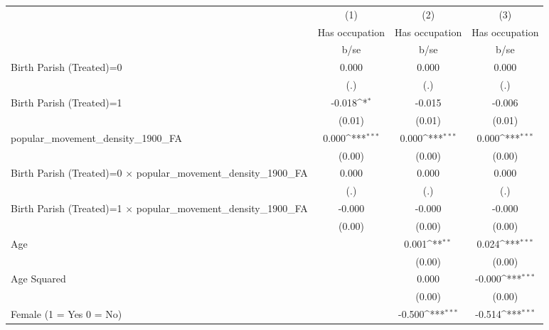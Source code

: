 {
\def\sym#1{\ifmmode^{#1}\else\(^{#1}\)\fi}
\begin{tabular}{l*{3}{c}}
\hline\hline
                    &\multicolumn{1}{c}{(1)}&\multicolumn{1}{c}{(2)}&\multicolumn{1}{c}{(3)}\\
                    &\multicolumn{1}{c}{Has occupation}&\multicolumn{1}{c}{Has occupation}&\multicolumn{1}{c}{Has occupation}\\
                    &        b/se         &        b/se         &        b/se         \\
\hline
Birth Parish (Treated)=0&       0.000         &       0.000         &       0.000         \\
                    &         (.)         &         (.)         &         (.)         \\
Birth Parish (Treated)=1&      -0.018\sym{*}  &      -0.015         &      -0.006         \\
                    &      (0.01)         &      (0.01)         &      (0.01)         \\
popular\_movement\_density\_1900\_FA&       0.000\sym{***}&       0.000\sym{***}&       0.000\sym{***}\\
                    &      (0.00)         &      (0.00)         &      (0.00)         \\
Birth Parish (Treated)=0 $\times$ popular\_movement\_density\_1900\_FA&       0.000         &       0.000         &       0.000         \\
                    &         (.)         &         (.)         &         (.)         \\
Birth Parish (Treated)=1 $\times$ popular\_movement\_density\_1900\_FA&      -0.000         &      -0.000         &      -0.000         \\
                    &      (0.00)         &      (0.00)         &      (0.00)         \\
Age                 &                     &       0.001\sym{**} &       0.024\sym{***}\\
                    &                     &      (0.00)         &      (0.00)         \\
Age Squared         &                     &       0.000         &      -0.000\sym{***}\\
                    &                     &      (0.00)         &      (0.00)         \\
Female (1 = Yes 0 = No)&                     &      -0.500\sym{***}&      -0.514\sym{***}\\

\end{tabular}}
